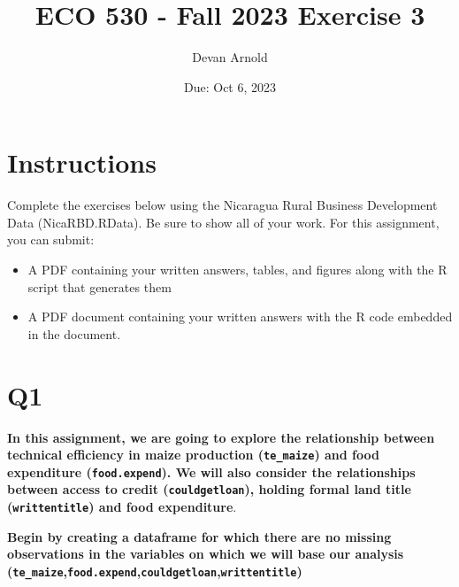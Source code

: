 \documentclass[
]{article}
\title{ECO 530 - Fall 2023 Exercise 3}
\author{Devan Arnold}
\date{Due: Oct 6, 2023}
\begin{document}
\maketitle

\DeclareMathOperator{\Lagr}{\mathcal{L}}
\DeclareMathOperator{\sumn}{\sum_{i=1}^n}
\DeclareMathOperator{\bh}{\hat{\beta}}
\DeclareMathOperator{\yh}{\hat{y}}
\DeclareMathOperator{\ybar}{\bar{y}}
\DeclareMathOperator{\xbar}{\bar{x}}
\usepackage{amsmath}

\hypertarget{instructions}{%
\section{Instructions}\label{instructions}}

Complete the exercises below using the Nicaragua Rural Business
Development Data (NicaRBD.RData). Be sure to show all of your work. For
this assignment, you can submit:

\begin{itemize}
\item
  A PDF containing your written answers, tables, and figures along with
  the R script that generates them
\item
  A PDF document containing your written answers with the R code
  embedded in the document.
\end{itemize}

\hfill\break

\hfill\break

\hypertarget{q1}{%
\section{Q1}\label{q1}}

\textbf{In this assignment, we are going to explore the relationship
between technical efficiency in maize production (\texttt{te\_maize})
and food expenditure (\texttt{food.expend}). We will also consider the
relationships between access to credit (\texttt{couldgetloan}), holding
formal land title (\texttt{writtentitle}) and food expenditure}.

\hfill\break

\textbf{Begin by creating a dataframe for which there are no missing
observations in the variables on which we will base our analysis
(\texttt{te\_maize},\texttt{food.expend},\texttt{couldgetloan},\texttt{writtentitle})}

\hfill\break
\end{document}
